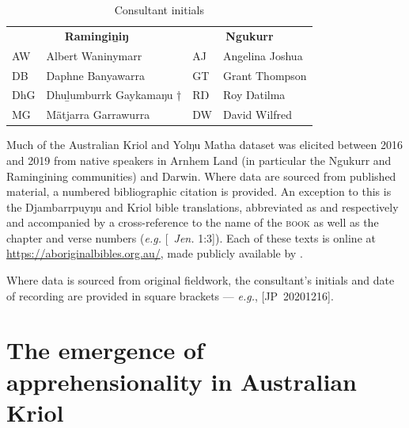 \documentclass[12pt,dvipsnames]{report}
\begin{document}
\begin{table}\caption[List of consultants]{Consultant initials}
\centering	\begin{tabular}{ll|ll}
	\multicolumn{2}{c}{\textbf{Ramingiṉiŋ}} &	\multicolumn{2}{c}{\textbf{Ngukurr}}\\
	AW& Albert Waninymarr	& AJ & Angelina Joshua\\
	DB & Daphne Banyawarra	& GT & Grant Thompson\\
	DhG & Dhuḻumburrk Gaykamaŋu † & RŊ & Roy Ŋatilma	\\
	MG & Mätjarra Garrawurra& DW & David Wilfred \\
	\end{tabular}
\end{table}


Much of the Australian Kriol and Yolŋu Matha dataset was elicited between 2016 and 2019 from native speakers in Arnhem Land (in particular the Ngukurr and Ramingining communities) and Darwin. Where data are sourced from published material, a numbered bibliographic citation is provided. An exception to this is the Djambarrpuyŋu and Kriol bible translations, abbreviated as  and  respectively and accompanied by a cross-reference to the name of the \textsc{book} as well as the chapter and verse numbers (\textit{e.g.} [~\textit{Jen.} 1:3]). Each of these texts is online at \url{https://aboriginalbibles.org.au/}, made publicly available by \citet{KB,DB}.

  Where data is sourced from original fieldwork, the consultant's initials and date of recording are provided in square brackets --- \textit{e.g.}, [JP~20201216].

\part{The emergence of apprehensionality in Australian Kriol}\label{bambai}
 



%
\end{document}
